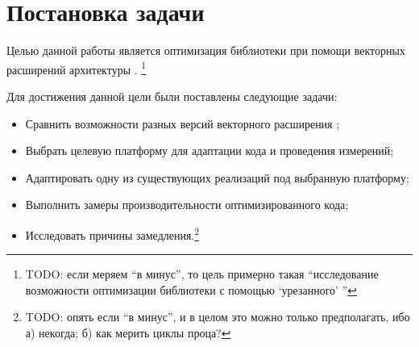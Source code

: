 
\section{Постановка задачи}
\label{sec:task}
Целью данной работы является оптимизация библиотеки \xxHash{} при помощи векторных расширений архитектуры \riscv{}.
\footnote{TODO: если меряем \enquote{в минус}, то цель примерно такая \enquote{исследование возможности оптимизации библиотеки \xxHash{} с помощью \enquote{урезанного} \rvv{}}}

Для достижения данной цели были поставлены следующие задачи:
\begin{itemize}
	\item Сравнить возможности разных версий векторного расширения \riscv{};
	\item Выбрать целевую платформу для адаптации кода и проведения измерений;
	\item Адаптировать одну из существующих реализаций под выбранную платформу;
	\item Выполнить замеры производительности оптимизированного кода;
	\item Исследовать причины замедления.\footnote{TODO: опять если \enquote{в минус}, и в целом это можно только предполагать, ибо а) некогда; б) как мерить циклы проца?}
\end{itemize}
